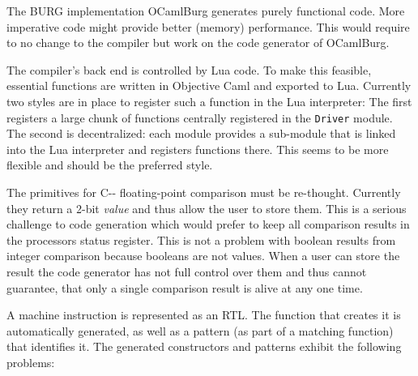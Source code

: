 \documentclass[11pt]{article}
\newcommand\PAL{{\small C-{}-}}
\newcommand\rtl{{\small RTL}}
\newcommand\burg{{\small BURG}}
\begin{document}
The {\burg} implementation OCamlBurg generates purely functional code.
More imperative code might provide better (memory) performance. This
would require to no change to the compiler but work on the code
generator of OCamlBurg.
    
The compiler's back end is controlled by Lua code. To make this
feasible, essential functions are written in Objective Caml and exported
to Lua. Currently two styles are in place to register such a function in
the Lua interpreter: The first registers a large chunk of functions
centrally registered in the \texttt{Driver} module. The second is
decentralized: each module provides a sub-module that is linked into the
Lua interpreter and registers functions there. This seems to be more
flexible and should be the preferred style.

The primitives for {\PAL} floating-point comparison must be
re-thought. Currently they return a 2-bit \emph{value} and thus allow
the user to store them. This is a serious challenge to code generation
which would prefer to keep all comparison results in the processors
status register. This is not a problem with boolean results from integer
comparison because booleans are not values.  When a user can  store the
result the code generator has not full control over them and thus cannot
guarantee, that only a single comparison result is alive at any one
time.

A machine instruction is represented as an {\rtl}. The function
that creates it is automatically generated, as well as a pattern (as part
of a matching function) that identifies it. The generated constructors
and patterns exhibit the following problems:
\end{document}
